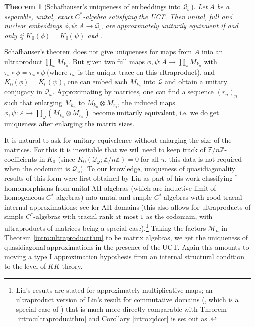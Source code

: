 \documentclass[reqno]{amsart}
\newtheorem*{theorem*}{Theorem}
\theoremstyle{definition}
\theoremstyle{remark}
\numberwithin{equation}{section}
\theoremstyle{definition}
\newcommand{\calQ}{\mathcal{Q}}
\begin{document}
\begin{theorem*}[Schafhauser's uniqueness of embeddings into $\mathcal Q_\omega$]
    Let $A$ be a separable, unital, exact $C^*$-algebra satisfying the UCT. Then unital, full and nuclear embeddings $\phi,\psi\colon A\to \mathcal Q_\omega$ are approximately unitarily equivalent if and only if $K_0(\phi)=K_0(\psi)$ and \text{$\tau_{\calQ_\omega}\circ\phi=\tau_{\calQ_\omega}\circ \psi$}.
\end{theorem*} 

Schafhauser's theorem does not give uniqueness for maps from $A$ into an ultraproduct $\prod_{\omega} M_{k_n}$. But given two full maps $\phi,\psi:A\to\prod_{\omega} M_{k_n}$ with $\tau_{\omega}\circ\phi=\tau_{\omega}\circ\phi$ (where $\tau_{\omega}$ is the unique trace on this ultraproduct), and $K_0(\phi)=K_0(\psi)$, one can embed each $M_{k_n}$ into $\calQ$ and obtain a unitary conjugacy in $\mathcal Q_\omega$.  Approximating by matrices, one can  find a sequence $(r_n)_{n}$ such that enlarging $M_{k_n}$ to $M_{k_n}\otimes M_{r_n}$, the induced maps $\tilde\phi,\tilde\psi:A\to\prod_{\omega} (M_{k_n}\otimes M_{r_n})$ become unitarily equivalent, i.e. we do get uniqueness after enlarging the matrix sizes.

It is natural to ask for unitary equivalence without enlarging the size of the matrices. For this it is inevitable that we will need to keep track of $\mathbb Z/n\mathbb Z$-coefficients in $K_0$ (since $K_0(\mathcal Q_\omega;\mathbb Z/n\mathbb Z)=0$ for all $n$, this data is not required when the codomain is $\mathcal Q_\omega$). To our knowledge, uniqueness of quasidiagonality results of this form were first obtained by Lin as part of his work classifying $^*$-homomorphisms from unital AH-algebras (which are inductive limit of homogeneous $C^*$-algebras) into unital and simple $C^*$-algebras with good tracial internal approximations; see \cite[Theorem 5.8]{Lin_2017} for AH domains (this also allows for ultraproducts of simple $C^*$-algebras with tracial rank at most $1$ as the codomain, with ultraproducts of matrices being a special case).\footnote{Lin's results are stated for approximately multiplicative maps; an ultraproduct version of Lin's result for commutative domains (\cite[Theorem 2.10]{Lin_2017}, which is a special case of \cite[Theorem 4.6]{Lin07}) that is much more directly comparable with Theorem \ref{intro:ultraproductthm} and Corollary \ref{intro:qdcor} is set out as \cite[Theorem 2.4]{Nuclear_dim_extension}.} Taking the factors $\mathcal M_n$ in Theorem \ref{intro:ultraproductthm} to be matrix algebras, we get the uniqueness of quasidiagonal approximations in the presence of the UCT.  Again this amounts to moving a type I approximation hypothesis from an internal structural condition to the level of $KK$-theory. 
\end{document}
